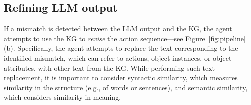 \subsection{Refining LLM output}
\label{sec:framework-refine}
If a mismatch is detected between the LLM output and the KG, the agent attempts to use the KG to \textit{revise} the action sequence---see Figure~\ref{fig:pipeline}(b). 
Specifically, the agent attempts to replace the text corresponding to the identified mismatch, which can refer to actions, object instances, or object attributes, with other text from the KG.
While performing such text replacement, it is important to consider syntactic similarity, which measures similarity in the structure (e.g., of words or sentences), and semantic similarity, which considers similarity in meaning.
